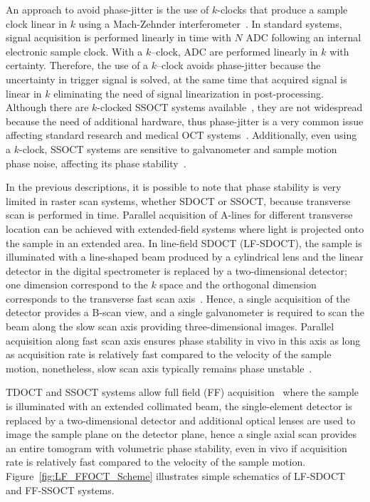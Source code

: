 An approach to avoid phase-jitter is the use of $k$-clocks that produce a sample clock linear in $k$ using a Mach-Zehnder interferometer~\cite{Johnson_Multispeed}. In standard systems, signal acquisition is performed linearly in time with $N$ ADC following an internal electronic sample clock. With a $k$--clock, ADC are performed linearly in $k$ with certainty. Therefore, the use of a $k$--clock avoids phase-jitter because the uncertainty in trigger signal is solved, at the same time that acquired signal is linear in $k$ eliminating the need of signal linearization in post-processing. Although there are $k$-clocked SSOCT systems available~\cite{Kumar2017_Invivo}, they are not widespread because the need of additional hardware, thus phase-jitter is a very common issue affecting standard research and medical OCT systems~\cite{Bouma2015_Optical}. Additionally, even using a $k$-clock, SSOCT systems are sensitive to galvanometer and sample motion phase noise, affecting its phase stability~\cite{Shemonski2014_Stability-1}.

In the previous descriptions, it is possible to note that phase stability is very limited in raster scan systems, whether SDOCT or SSOCT, because transverse scan is performed in time. Parallel acquisition of A-lines for different transverse location can be achieved with extended-field systems where light is projected onto the sample in an extended area. In line-field SDOCT (LF-SDOCT), the sample is illuminated with a line-shaped beam produced by a cylindrical lens and the linear detector in the digital spectrometer is replaced by a two-dimensional detector; one dimension correspond to the $k$ space and the orthogonal dimension corresponds to the transverse fast scan axis~\cite{Nakamura2007_Highspeed, Ginner2017_Noniterative}. Hence, a single acquisition of the detector provides a B-scan view, and a single galvanometer is required to scan the beam along the slow scan axis providing three-dimensional images. Parallel acquisition along fast scan axis ensures phase stability in vivo in this axis as long as acquisition rate is relatively fast compared to the velocity of the sample motion, nonetheless, slow scan axis typically remains phase unstable~\cite{Ginner2017_Noniterative}.

TDOCT and SSOCT systems allow full field (FF) acquisition~\cite{Dubois2002_Highresolution, Hillmann2016_Aberrationfree} where the sample is illuminated with an extended collimated beam, the single-element detector is replaced by a two-dimensional detector and additional optical lenses are used to image the sample plane on the detector plane, hence a single axial scan provides an entire tomogram with volumetric phase stability, even in vivo if acquisition rate is relatively fast compared to the velocity of the sample motion. Figure~\ref{fig:LF_FFOCT_Scheme} illustrates simple schematics of LF-SDOCT and FF-SSOCT systems.

